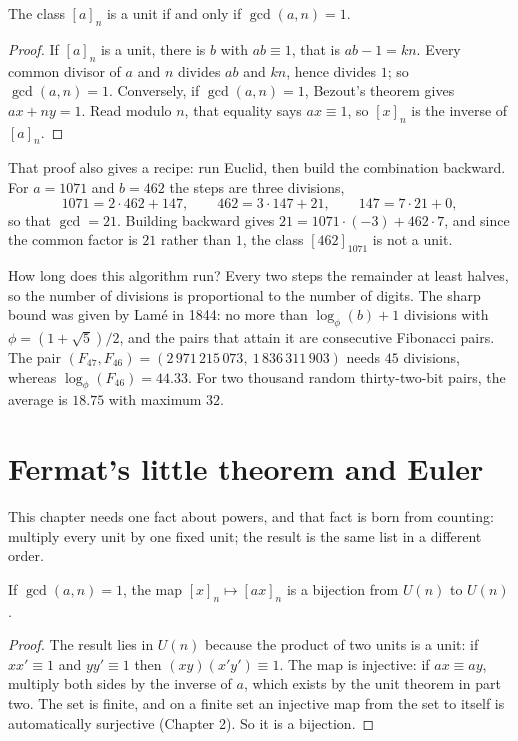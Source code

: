 \begin{teorema}
The class $[a]_n$ is a unit if and only if $\gcd(a,n)=1$.
\end{teorema}

\begin{proof}
If $[a]_n$ is a unit, there is $b$ with $ab\equiv1$, that is $ab-1=kn$. Every common divisor of $a$
and $n$ divides $ab$ and $kn$, hence divides $1$; so $\gcd(a,n)=1$. Conversely, if $\gcd(a,n)=1$,
Bezout's theorem gives $ax+ny=1$. Read modulo $n$, that equality says $ax\equiv1$, so $[x]_n$ is the
inverse of $[a]_n$.
\end{proof}

That proof also gives a recipe: run Euclid, then build the combination backward. For $a=1071$ and
$b=462$ the steps are three divisions,
\[
1071=2\cdot462+147,\qquad 462=3\cdot147+21,\qquad 147=7\cdot21+0,
\]
so that $\gcd=21$. Building backward gives $21=1071\cdot(-3)+462\cdot7$, and since the common factor
is $21$ rather than $1$, the class $[462]_{1071}$ is not a unit.

How long does this algorithm run? Every two steps the remainder at least halves, so the number of
divisions is proportional to the number of digits. The sharp bound was given by Lam\'e in 1844: no
more than $\log_\phi(b)+1$ divisions with $\phi=(1+\sqrt5)/2$, and the pairs that attain it are
consecutive Fibonacci pairs. The pair $(F_{47},F_{46})=(2\,971\,215\,073,\ 1\,836\,311\,903)$ needs
$45$ divisions, whereas $\log_\phi(F_{46})=44.33$. For two thousand random thirty-two-bit pairs, the
average is $18.75$ with maximum $32$.


\section{Fermat's little theorem and Euler}

This chapter needs one fact about powers, and that fact is born from counting: multiply every unit by
one fixed unit; the result is the same list in a different order.

\begin{lemma}
If $\gcd(a,n)=1$, the map $[x]_n\mapsto[ax]_n$ is a bijection from $U(n)$ to $U(n)$.
\end{lemma}

\begin{proof}
The result lies in $U(n)$ because the product of two units is a unit: if $xx'\equiv1$ and
$yy'\equiv1$ then $(xy)(x'y')\equiv1$. The map is injective: if $ax\equiv ay$, multiply both sides by
the inverse of $a$, which exists by the unit theorem in part two. The set is finite, and on a finite
set an injective map from the set to itself is automatically surjective (Chapter 2). So it is a
bijection.
\end{proof}

